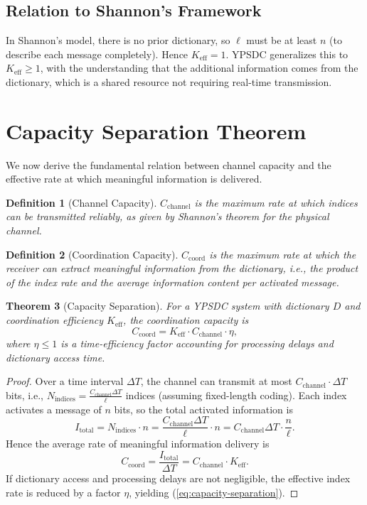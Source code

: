 \documentclass[12pt,a4paper]{article}
\newtheorem{theorem}{Theorem}[section]
\newtheorem{definition}[theorem]{Definition}
\theoremstyle{remark}
\newcommand{\Keff}{K_{\mathrm{eff}}}
\begin{document}
	\subsection{Relation to Shannon's Framework}
	
	In Shannon's model, there is no prior dictionary, so $\ell$ must be at least $n$ (to describe each message completely). Hence $\Keff = 1$. YPSDC generalizes this to $\Keff \ge 1$, with the understanding that the additional information comes from the dictionary, which is a shared resource not requiring real-time transmission.
	
	\section{Capacity Separation Theorem}
	\label{sec:separation}
	
	We now derive the fundamental relation between channel capacity and the effective rate at which meaningful information is delivered.
	
	\begin{definition}[Channel Capacity]
		$C_{\text{channel}}$ is the maximum rate at which indices can be transmitted reliably, as given by Shannon's theorem for the physical channel.
	\end{definition}
	
	\begin{definition}[Coordination Capacity]
		$C_{\text{coord}}$ is the maximum rate at which the receiver can extract meaningful information from the dictionary, i.e., the product of the index rate and the average information content per activated message.
	\end{definition}
	
	\begin{theorem}[Capacity Separation] \label{thm:capacity-separation}
		For a YPSDC system with dictionary $D$ and coordination efficiency $\Keff$, the coordination capacity is
		\begin{equation}
			C_{\text{coord}} = \Keff \cdot C_{\text{channel}} \cdot \eta,
			\label{eq:capacity-separation}
		\end{equation}
		where $\eta \le 1$ is a time-efficiency factor accounting for processing delays and dictionary access time.
	\end{theorem}
	
	\begin{proof}
		Over a time interval $\Delta T$, the channel can transmit at most $C_{\text{channel}} \cdot \Delta T$ bits, i.e., $N_{\text{indices}} = \frac{C_{\text{channel}} \Delta T}{\ell}$ indices (assuming fixed-length coding). Each index activates a message of $n$ bits, so the total activated information is
		\[
		I_{\text{total}} = N_{\text{indices}} \cdot n = \frac{C_{\text{channel}} \Delta T}{\ell} \cdot n = C_{\text{channel}} \Delta T \cdot \frac{n}{\ell}.
		\]
		Hence the average rate of meaningful information delivery is
		\[
		C_{\text{coord}} = \frac{I_{\text{total}}}{\Delta T} = C_{\text{channel}} \cdot \Keff.
		\]
		If dictionary access and processing delays are not negligible, the effective index rate is reduced by a factor $\eta$, yielding (\ref{eq:capacity-separation}).
	\end{proof}
	
\end{document}
